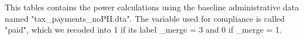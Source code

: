 This tables contains the power calculations using the baseline administrative data named "tax\_payments\_noPII.dta". The variable used for compliance is called "paid", which we recoded into 1 if its label \_merge = 3 and 0 if  \_merge = 1. 